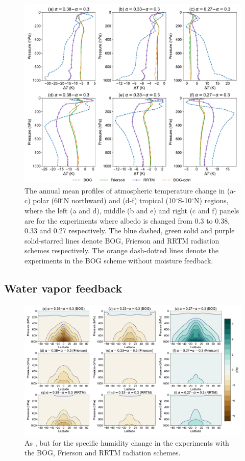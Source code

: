 \begin{figure}[ht]
	\centering
	\includegraphics[width=0.8\linewidth]{figs/polar_amp/temp_profile}
	\caption[The annual mean profiles of atmospheric temperature change in polar (60$^\circ$N northward) and tropical (10$^\circ$S-10$^\circ$N) regions]{The annual mean profiles of atmospheric temperature change in (a-c) polar (60$^\circ$N northward) and (d-f) tropical (10$^\circ$S-10$^\circ$N) regions, where the left (a and d), middle (b and e) and right (c and f) panels are for the experiments where albedo is changed from 0.3 to 0.38, 0.33 and 0.27 respectively. The blue dashed, green solid and purple solid-starred lines denote BOG, Frierson and RRTM radiation schemes respectively. The orange dash-dotted lines denote the experiments in the BOG scheme without moisture feedback.}
	\label{fig:delta_t_profile}
\end{figure}


\subsection{Water vapor feedback}
\label{sec:wv_feedback}

\begin{figure}[ht]
	\centering
	\includegraphics[width=1.0\linewidth]{figs/polar_amp/sphum_diff}
	\caption[The annual and zonal mean profiles of specific humidity changes]{As , but for the specific humidity change in the experiments with the BOG, Frierson and RRTM radiation schemes.}
	\label{fig:vert_q_diff}
\end{figure}

